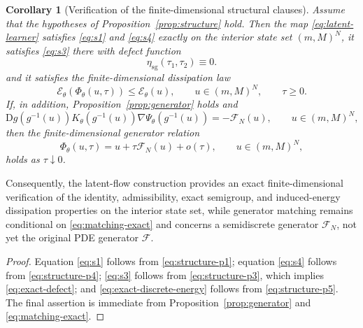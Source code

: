 \documentclass[11pt]{article}
\newtheorem{corollary}{Corollary}
\newcommand{\cE}{\mathcal{E}}
\newcommand{\cF}{\mathcal{F}}
\newcommand{\cFN}{\mathcal{F}_N}
\newcommand{\PhiT}{\Phi_{\theta}}
\begin{document}
\begin{corollary}[Verification of the finite-dimensional structural clauses]\label{cor:verification}
Assume that the hypotheses of Proposition~\ref{prop:structure} hold. Then the map \eqref{eq:latent-learner} satisfies \eqref{eq:s1} and \eqref{eq:s4} exactly on the interior state set \((m,M)^N\), it satisfies \eqref{eq:s3} there with defect function
\begin{equation}\label{eq:exact-defect}
\eta_{\mathrm{sg}}(\tau_1,\tau_2)\equiv 0.
\end{equation}
and it satisfies the finite-dimensional dissipation law
\begin{equation}\label{eq:exact-discrete-energy}
\cE_{\theta}(\PhiT(u,\tau))\le \cE_{\theta}(u), \qquad u\in (m,M)^N, \qquad \tau\ge 0.
\end{equation}
If, in addition, Proposition~\ref{prop:generator} holds and
\begin{equation}\label{eq:matching-exact}
\mathrm{D}g(g^{-1}(u))K_{\theta}(g^{-1}(u))\nabla \Psi_{\theta}(g^{-1}(u))=-\cFN(u), \qquad u\in (m,M)^N,
\end{equation}
then the finite-dimensional generator relation
\begin{equation}\label{eq:s2-finite}
\PhiT(u,\tau)=u+\tau\cFN(u)+o(\tau), \qquad u\in (m,M)^N,
\end{equation}
holds as \(\tau\downarrow 0\).
\end{corollary}

Consequently, the latent-flow construction provides an exact finite-dimensional verification of the identity, admissibility, exact semigroup, and induced-energy dissipation properties on the interior state set, while generator matching remains conditional on \eqref{eq:matching-exact} and concerns a semidiscrete generator \(\cFN\), not yet the original PDE generator \(\cF\).

\begin{proof}
Equation \eqref{eq:s1} follows from \eqref{eq:structure-p1}; equation \eqref{eq:s4} follows from \eqref{eq:structure-p4}; \eqref{eq:s3} follows from \eqref{eq:structure-p3}, which implies \eqref{eq:exact-defect}; and \eqref{eq:exact-discrete-energy} follows from \eqref{eq:structure-p5}. The final assertion is immediate from Proposition~\ref{prop:generator} and \eqref{eq:matching-exact}.
\end{proof}
\end{document}
